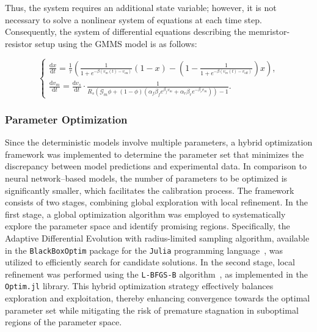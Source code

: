 \documentclass[11pt, oneside]{article}
\newcommand{\G}{\mathcal{G}}
\begin{document}
Thus, the system requires an additional state variable; however, it is not necessary to solve a nonlinear system of equations at each time step. Consequently, the system of differential equations describing the memristor-resistor setup using the GMMS model is as follows:

\begin{equation}
    \begin{cases}
        \displaystyle \frac{\mathrm{d} x}{\mathrm{d} t} = \frac{1}{\tau} \left( \frac{1}{1 + e^{-\beta \left(v_m(t) - v_{\mathrm{on}}\right)}} (1 - x) - \left( 1 - \frac{1}{1 + e^{-\beta \left(v_m(t) - v_{\mathrm{off}}\right)}} \right) x \right), \\
        \displaystyle \frac{\mathrm{d} v_m}{\mathrm{d} t} = \frac{\mathrm{d} v_s}{\mathrm{d} t} \cdot \frac{1}{R_s \left( \G_{m} \phi + (1 - \phi) \left( \alpha_f \beta_f e^{\beta_f v_m} + \alpha_r \beta_r e^{-\beta_r v_m} \right) \right) - 1}.
    \end{cases}
\end{equation}


\subsubsection{Parameter Optimization}
Since the deterministic models involve multiple parameters, a hybrid optimization framework was implemented to determine the parameter set that minimizes the discrepancy between model predictions and experimental data. In comparison to neural network--based models, the number of parameters to be optimized is significantly smaller, which facilitates the calibration process. The framework consists of two stages, combining global exploration with local refinement. In the first stage, a global optimization algorithm was employed to systematically explore the parameter space and identify promising regions. Specifically, the Adaptive Differential Evolution with radius-limited sampling algorithm, available in the \verb|BlackBoxOptim| package for the \texttt{Julia} programming language~\cite{BlackBoxOptim}, was utilized to efficiently search for candidate solutions. In the second stage, local refinement was performed using the \texttt{L-BFGS-B} algorithm~\cite{Zhu1997}, as implemented in the \texttt{Optim.jl} library. This hybrid optimization strategy effectively balances exploration and exploitation, thereby enhancing convergence towards the optimal parameter set while mitigating the risk of premature stagnation in suboptimal regions of the parameter space.
\end{document}

